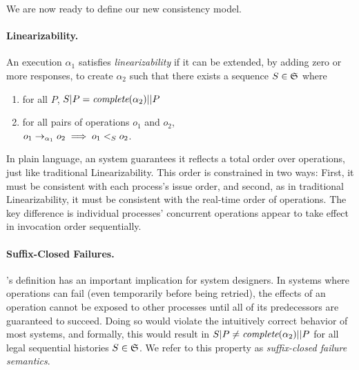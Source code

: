 We are now ready to define our new consistency model.
\paragraph{\Multidispatch{} Linearizability.} An execution $\alpha_1$ satisfies \textit{\multidispatch{} linearizability} if it
can be extended, by adding zero or more responses, to create $\alpha_2$ such that
there exists a sequence $S \in \mathfrak{S}$ where 
\begin{enumerate}
    \item for all $P$,
$S|P = \operatorname*{\textit{complete}}(\alpha_2)||P$
    \item for all pairs of operations
$o_1$ and $o_2$, \\$o_1 \rightarrow_{\alpha_1} o_2 \implies o_1 <_S o_2$.
\end{enumerate}

In plain language, an \MDL{} system guarantees it reflects a total order 
over operations, just like traditional Linearizability. This order is constrained in two ways: First,
it must be consistent with each process's issue order, and second, as in traditional Linearizability,
it must be consistent with the real-time order of operations. The key difference is individual processes' concurrent operations appear to take effect in invocation order sequentially.

\paragraph{Suffix-Closed Failures.}
\label{sec:mdl:def:failures}

\MDL{}'s definition has an important implication for system designers.
In systems where operations can fail (even temporarily before being retried), the
effects of an operation cannot be exposed to other processes until all of its 
predecessors are guaranteed to succeed. Doing so would violate the intuitively
correct behavior of most systems, and formally, this would result in
$S|P \neq \operatorname*{\textit{complete}}(\alpha_2)||P$ for all legal sequential histories
$S \in \mathfrak{S}$.
We refer to this property as \textit{suffix-closed failure semantics}.


